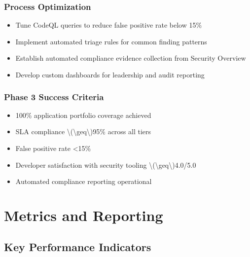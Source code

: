 \documentclass[11pt]{article}
\begin{document}
\subsubsection{Process Optimization}

\begin{itemize}[leftmargin=*]
\item Tune CodeQL queries to reduce false positive rate below 15\%
\item Implement automated triage rules for common finding patterns
\item Establish automated compliance evidence collection from Security Overview
\item Develop custom dashboards for leadership and audit reporting
\end{itemize}
\subsubsection{Phase 3 Success Criteria}

\begin{itemize}[leftmargin=*]
\item 100\% application portfolio coverage achieved
\item SLA compliance \textbackslash{}(\textbackslash{}geq\textbackslash{})95\% across all tiers
\item False positive rate \textless{}15\%
\item Developer satisfaction with security tooling \textbackslash{}(\textbackslash{}geq\textbackslash{})4.0/5.0
\item Automated compliance reporting operational
\end{itemize}
\section{Metrics and Reporting}

\subsection{Key Performance Indicators}
\end{document}
